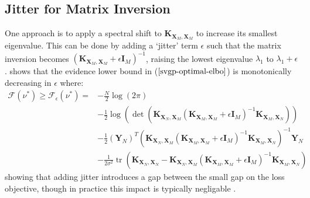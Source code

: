 \documentclass[twoside,11pt]{article}
\newcommand{\tr}{\operatorname{tr}}
\begin{document}
\subsection{Jitter for Matrix Inversion}
One approach is to apply a spectral shift to 
$\mathbf{K}_{\mathbf{X}_M, \mathbf{X}_M}$ to increase its smallest eigenvalue. This can be done by adding a `jitter' term $\epsilon$ such that the matrix inversion becomes $\left(\mathbf{K}_{\mathbf{X}_M, \mathbf{X}_M}+\epsilon\mathbf{I}_M\right)^{-1}$, raising the lowest eigenvalue $\lambda_1$ to $\lambda_1 + \epsilon$. \cite{burt2020convergence} shows that the evidence lower bound in ($\ref{svgp-optimal-elbo}$) is monotonically decreasing in $\epsilon$ where:
\begin{align}
    \label{svgp-optimal-elbo-jitter}
    \mathcal{F}(\nu^*) \geq \mathcal{F}_{\epsilon}(\nu^*) = & -\frac{N}{2} \log\left(2\pi \right) \\
    & -\frac{1}{2} \log \left(\det\left( \mathbf{K}_{\mathbf{X}_N, \mathbf{X}_M}\left(\mathbf{K}_{\mathbf{X}_M, \mathbf{X}_M} +\epsilon\mathbf{I}_M\right)^{-1} \mathbf{K}_{\mathbf{X}_M, \mathbf{X}_N}\right)\right)\\
    & -\frac{1}{2} \left(\mathbf{Y}_N\right)^T \left( \mathbf{K}_{\mathbf{X}_N, \mathbf{X}_M}\left(\mathbf{K}_{\mathbf{X}_M, \mathbf{X}_M}+\epsilon\mathbf{I}_M\right)^{-1} \mathbf{K}_{\mathbf{X}_M, \mathbf{X}_N}\right)^{-1} \mathbf{Y}_N \\
    & - \frac{1}{2\sigma^2}\tr\left(\mathbf{K}_{\mathbf{X}_N, \mathbf{X}_N} - \mathbf{K}_{\mathbf{X}_N, \mathbf{X}_M}\left(\mathbf{K}_{\mathbf{X}_M, \mathbf{X}_M}+\epsilon\mathbf{I}_M\right)^{-1} \mathbf{K}_{\mathbf{X}_M, \mathbf{X}_N}\right)
\end{align}
showing that adding jitter introduces a gap between the small gap on the loss objective, though in practice this impact is typically negligable \cite{burt2020convergence}.
\end{document}
